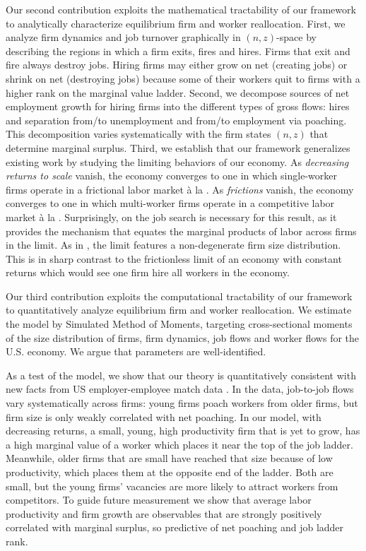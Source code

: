 Our second contribution exploits the mathematical tractability of our framework to analytically characterize equilibrium firm and worker reallocation.
First, we analyze firm dynamics and job turnover graphically in $\left(n,z\right)$-space by describing the regions in which a firm exits, fires and hires.
Firms that exit and fire always destroy jobs.
Hiring firms may either grow on net (creating jobs) or shrink on net (destroying jobs) because some of their workers quit to firms with a higher rank on the marginal value ladder.
Second, we decompose sources of net employment growth for hiring firms into the different types of gross flows: hires and separation from/to unemployment and from/to employment via poaching.
This decomposition varies systematically with the firm states $\left(n,z\right)$ that determine marginal surplus.
Third, we establish that our framework generalizes existing work by studying the limiting behaviors of our economy.
As \emph{decreasing returns to scale} vanish, the economy converges to one in which single-worker firms operate in a frictional labor market \`{a} la \citet{postelvinayrobin2002}.
As \emph{frictions} vanish, the economy converges to one in which multi-worker firms operate in a competitive labor market \`{a} la \citet{HopenhaynEMET}.
Surprisingly, on the job search is necessary for this result, as it provides the mechanism that equates the marginal products of labor across firms in the limit.
As in \citet{HopenhaynEMET}, the limit features a non-degenerate firm size distribution.
This is in sharp contrast to the frictionless limit of an economy with constant returns which would see one firm hire all workers in the economy.

Our third contribution exploits the computational tractability of our framework to quantitatively analyze equilibrium firm and worker reallocation.
We estimate the model by Simulated Method of Moments, targeting cross-sectional moments of the size distribution of firms, firm dynamics, job flows and worker flows for the U.S. economy.
We argue that parameters are well-identified.

As a test of the model, we show that our theory is quantitatively consistent with new facts from US employer-employee match data \citep{HHKM2018}.
In the data, job-to-job flows vary systematically across firms: young firms poach workers from older firms, but firm size is only weakly correlated with net poaching.
In our model, with decreasing returns, a small, young, high productivity firm that is yet to grow, has a high marginal value of a worker which places it near the top of the job ladder.
Meanwhile, older firms that are small have reached that size because of low productivity, which places them at the opposite end of the ladder.
Both are small, but the young firms' vacancies are more likely to attract workers from competitors.
To guide future measurement we show that average labor productivity and firm growth are observables that are strongly positively correlated with marginal surplus, so predictive of net poaching and job ladder rank.

